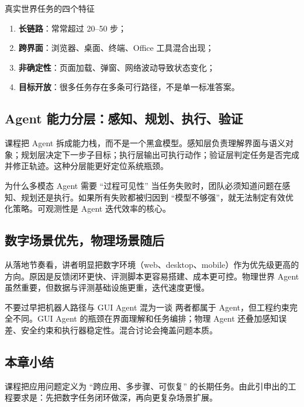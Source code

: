 \documentclass[a4paper]{article}
\begin{document}
\begin{importantbox}{真实世界任务的四个特征}
\begin{enumerate}
    \item \textbf{长链路}：常常超过 20--50 步；
    \item \textbf{跨界面}：浏览器、桌面、终端、Office 工具混合出现；
    \item \textbf{非确定性}：页面加载、弹窗、网络波动导致状态变化；
    \item \textbf{目标开放}：很多任务存在多条可行路径，不是单一标准答案。
\end{enumerate}
\end{importantbox}

\subsection{Agent 能力分层：感知、规划、执行、验证}
课程把 Agent 拆成能力栈，而不是一个黑盒模型。感知层负责理解界面与语义对象；规划层决定下一步子目标；执行层输出可执行动作；验证层判定任务是否完成并修正轨迹。这种分层能更好定位系统瓶颈。

\begin{knowledgebox}{为什么多模态 Agent 需要 ``过程可见性''}
当任务失败时，团队必须知道问题在感知、规划还是执行。如果所有失败都被归因到 ``模型不够强''，就无法制定有效优化策略。可观测性是 Agent 迭代效率的核心。
\end{knowledgebox}

\subsection{数字场景优先，物理场景随后}
从落地节奏看，讲者明显把数字环境（web、desktop、mobile）作为优先级更高的方向。原因是反馈闭环更快、评测脚本更容易搭建、成本更可控。物理世界 Agent 虽然重要，但数据与评测基础设施更重，迭代速度更慢。

\begin{warningbox}{不要过早把机器人路径与 GUI Agent 混为一谈}
两者都属于 Agent，但工程约束完全不同。GUI Agent 的瓶颈在界面理解和任务编排；物理 Agent 还叠加感知误差、安全约束和执行器稳定性。混合讨论会掩盖问题本质。
\end{warningbox}

\subsection{本章小结}
课程把应用问题定义为 ``跨应用、多步骤、可恢复'' 的长期任务。由此引申出的工程要求是：先把数字任务闭环做深，再向更复杂场景扩展。
\end{document}
